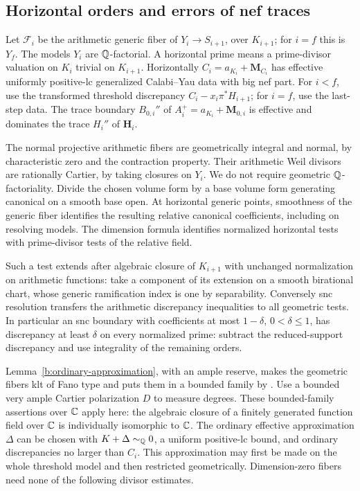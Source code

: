 \subsection{Horizontal orders and errors of nef traces}

Let \(\mathcal F_i\) be the arithmetic generic fiber of
\(Y_i\to S_{i+1}\), over \(K_{i+1}\); for \(i=f\) this is \(Y_f\).
The models \(Y_i\) are \(\mathbb Q\)-factorial. A horizontal prime means
a prime-divisor valuation on \(K_i\) trivial on \(K_{i+1}\).
Horizontally \(C_i=a_{K_i}+\mathbf M_{C_i}\) has effective uniformly
positive-lc generalized Calabi--Yau data with big nef part.
For \(i<f\), use the transformed threshold discrepancy
\(C_i-x_i\pi^*H_{i+1}\); for \(i=f\), use the last-step data.
The trace boundary \(B_{0,i}''\) of
\(A_i^+=a_{K_i}+\mathbf M_{0,i}\) is effective and dominates the
trace \(H_i''\) of \(\mathbf H_i\).

The normal projective arithmetic fibers are geometrically integral
and normal, by characteristic zero and the contraction property.
Their arithmetic Weil divisors are rationally Cartier, by taking
closures on \(Y_i\). We do not require geometric
\(\mathbb Q\)-factoriality. Divide the chosen volume form by a base volume
form generating canonical on a smooth base open. At horizontal
generic points, smoothness of the generic fiber identifies the
resulting relative canonical coefficients, including on resolving
models. The dimension formula identifies normalized horizontal
tests with prime-divisor tests of the relative field.

Such a test extends after algebraic closure of \(K_{i+1}\) with
unchanged normalization on arithmetic functions: take a component
of its extension on a smooth birational chart, whose generic
ramification index is one by separability. Conversely snc
resolution transfers the arithmetic discrepancy inequalities to all
geometric tests. In particular an snc boundary with coefficients at
most \(1-\delta\), \(0<\delta\le1\), has discrepancy at least
\(\delta\) on every normalized prime: subtract the reduced-support
discrepancy and use integrality of the remaining orders.

Lemma~\ref{b:ordinary-approximation}, with an ample reserve, makes
the geometric fibers klt of Fano type and puts them in a bounded
family by \cite[Theorem 1.1 and Corollary 1.4]{BirkarBAB}.
Use a bounded very ample Cartier polarization \(D\) to measure
degrees. These bounded-family assertions over \(\mathbb C\) apply here:
the algebraic closure of a finitely generated function field over
\(\mathbb C\) is individually isomorphic to \(\mathbb C\).
The ordinary effective approximation \(\Delta\) can be chosen with
\(K+\Delta\sim_\mathbb Q0\), a uniform positive-lc bound, and ordinary
discrepancies no larger than \(C_i\). This approximation may first
be made on the whole threshold model and then restricted
geometrically. Dimension-zero fibers need none of the following
divisor estimates.

